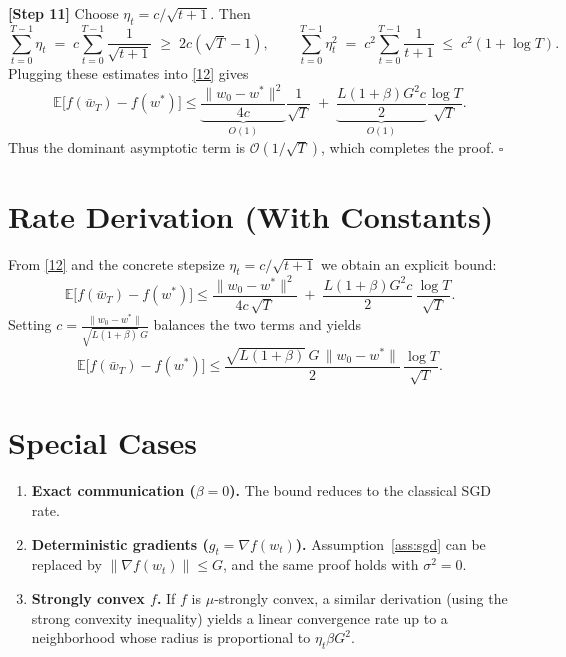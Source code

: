 \documentclass{article}
\newcommand{\E}{\mathbb{E}}
\newcommand{\norm}[1]{\left\lVert#1\right\rVert}
\begin{document}
\noindent\textbf{[Step 11]} Choose $\eta_{t}=c/\sqrt{t+1}$. Then
\[
\sum_{t=0}^{T-1}\eta_{t}\;=\;c\sum_{t=0}^{T-1}\frac{1}{\sqrt{t+1}}
\;\ge\;2c(\sqrt{T}-1),\qquad
\sum_{t=0}^{T-1}\eta_{t}^{2}\;=\;c^{2}\sum_{t=0}^{T-1}\frac{1}{t+1}
\;\le\;c^{2}(1+\log T).
\]
Plugging these estimates into \eqref{12} gives
\[
\E\!\bigl[f(\bar w_{T})-f(w^{*})\bigr]
\le
\underbrace{\frac{\|w_{0}-w^{*}\|^{2}}{4c}}_{\displaystyle O(1)}
\frac{1}{\sqrt{T}}
\;+\;
\underbrace{\frac{L(1+\beta)G^{2}c}{2}}_{\displaystyle O(1)}
\frac{\log T}{\sqrt{T}}.
\]
Thus the dominant asymptotic term is $\mathcal{O}(1/\sqrt{T})$, which completes the proof. \hfill $\square$

\section*{Rate Derivation (With Constants)}
From \eqref{12} and the concrete stepsize $\eta_{t}=c/\sqrt{t+1}$ we obtain an explicit bound:
\[
\E\!\bigl[f(\bar w_{T})-f(w^{*})\bigr]
\le
\frac{\|w_{0}-w^{*}\|^{2}}{4c\,\sqrt{T}}
\;+\;
\frac{L(1+\beta)G^{2}c}{2}\,
\frac{\log T}{\sqrt{T}}.
\]
Setting $c=\frac{\|w_{0}-w^{*}\|}{\sqrt{L(1+\beta)}\,G}$ balances the two terms and yields
\[
\E\!\bigl[f(\bar w_{T})-f(w^{*})\bigr]
\le
\frac{\sqrt{L(1+\beta)}\,G\,\|w_{0}-w^{*}\|}{2}\,
\frac{\log T}{\sqrt{T}}.
\]

\section*{Special Cases}
\begin{enumerate}
\item \textbf{Exact communication ($\beta=0$).} The bound reduces to the classical SGD rate.
\item \textbf{Deterministic gradients ($g_{t}=\nabla f(w_{t})$).} Assumption~\ref{ass:sgd} can be replaced by $\norm{\nabla f(w_{t})}\le G$, and the same proof holds with $\sigma^{2}=0$.
\item \textbf{Strongly convex $f$.} If $f$ is $\mu$‑strongly convex, a similar derivation (using the strong convexity inequality) yields a linear convergence rate up to a neighborhood whose radius is proportional to $\eta_{t}\beta G^{2}$.
\end{enumerate}
\end{document}
